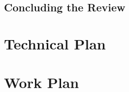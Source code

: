 \documentclass[a4paper, 12pt]{extreport}
\begin{document}
		\section{Concluding the Review}
	
	\chapter{Technical Plan}
	
		
	
	\chapter{Work Plan}
		
	
	\printbibliography[heading={bibnumbered}, title={References}]
		
\end{document}
